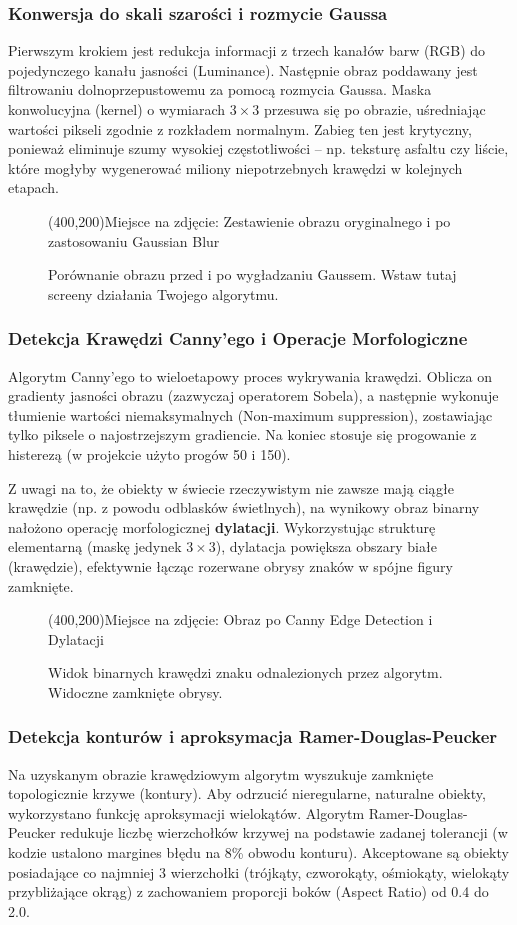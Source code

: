\documentclass[12pt,a4paper]{article}
\newcommand{\placeholderimage}[2]{
    \begin{figure}[H]
        \centering
        \framebox(400,200){Miejsce na zdjęcie: #1}
        \caption{#2}
    \end{figure}
}
\begin{document}
\subsubsection{Konwersja do skali szarości i rozmycie Gaussa}
Pierwszym krokiem jest redukcja informacji z trzech kanałów barw (RGB) do pojedynczego kanału jasności (Luminance). Następnie obraz poddawany jest filtrowaniu dolnoprzepustowemu za pomocą rozmycia Gaussa. Maska konwolucyjna (kernel) o wymiarach $3\times3$ przesuwa się po obrazie, uśredniając wartości pikseli zgodnie z rozkładem normalnym. Zabieg ten jest krytyczny, ponieważ eliminuje szumy wysokiej częstotliwości -- np. teksturę asfaltu czy liście, które mogłyby wygenerować miliony niepotrzebnych krawędzi w kolejnych etapach.

\placeholderimage{Zestawienie obrazu oryginalnego i po zastosowaniu Gaussian Blur}{Porównanie obrazu przed i po wygładzaniu Gaussem. Wstaw tutaj screeny działania Twojego algorytmu.}

\subsubsection{Detekcja Krawędzi Canny'ego i Operacje Morfologiczne}
Algorytm Canny'ego to wieloetapowy proces wykrywania krawędzi. Oblicza on gradienty jasności obrazu (zazwyczaj operatorem Sobela), a następnie wykonuje tłumienie wartości niemaksymalnych (Non-maximum suppression), zostawiając tylko piksele o najostrzejszym gradiencie. Na koniec stosuje się progowanie z histerezą (w projekcie użyto progów 50 i 150).

Z uwagi na to, że obiekty w świecie rzeczywistym nie zawsze mają ciągłe krawędzie (np. z powodu odblasków świetlnych), na wynikowy obraz binarny nałożono operację morfologicznej \textbf{dylatacji}. Wykorzystując strukturę elementarną (maskę jedynek $3\times3$), dylatacja powiększa obszary białe (krawędzie), efektywnie łącząc rozerwane obrysy znaków w spójne figury zamknięte.

\placeholderimage{Obraz po Canny Edge Detection i Dylatacji}{Widok binarnych krawędzi znaku odnalezionych przez algorytm. Widoczne zamknięte obrysy.}

\subsubsection{Detekcja konturów i aproksymacja Ramer-Douglas-Peucker}
Na uzyskanym obrazie krawędziowym algorytm wyszukuje zamknięte topologicznie krzywe (kontury). Aby odrzucić nieregularne, naturalne obiekty, wykorzystano funkcję aproksymacji wielokątów. Algorytm Ramer-Douglas-Peucker redukuje liczbę wierzchołków krzywej na podstawie zadanej tolerancji (w kodzie ustalono margines błędu na 8\% obwodu konturu). Akceptowane są obiekty posiadające co najmniej 3 wierzchołki (trójkąty, czworokąty, ośmiokąty, wielokąty przybliżające okrąg) z zachowaniem proporcji boków (Aspect Ratio) od 0.4 do 2.0.
\end{document}

